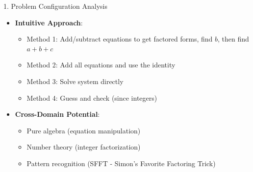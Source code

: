 \documentclass[12pt]{article}
\begin{document}
\begin{configbox}{1. Problem Configuration Analysis}
\begin{itemize}[leftmargin=*]
    \item \textbf{Intuitive Approach}: 
    \begin{itemize}
        \item Method 1: Add/subtract equations to get factored forms, find $b$, then find $a+b+c$
        \item Method 2: Add all equations and use the identity
        \item Method 3: Solve system directly
        \item Method 4: Guess and check (since integers)
    \end{itemize}
    
    \item \textbf{Cross-Domain Potential}: 
    \begin{itemize}
        \item Pure algebra (equation manipulation)
        \item Number theory (integer factorization)
        \item Pattern recognition (SFFT - Simon's Favorite Factoring Trick)
    \end{itemize}
\end{itemize}

\end{configbox}
\end{document}
